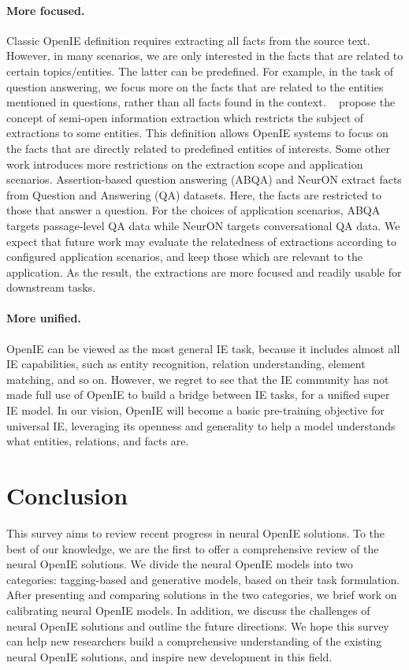 \documentclass{article}
\begin{document}
\paragraph{More focused.} Classic OpenIE definition requires extracting all facts from the source text. 
However, in many scenarios, we are only interested in the facts that are related to certain topics/entities. The latter can be predefined.  
For example, in the task of question answering, we focus more on the facts that are related to the entities mentioned in questions, rather than all facts found in the context.
\citeauthor{yu2021semi}~\citeyear{yu2021semi} propose the concept of semi-open information extraction which restricts the subject of extractions to some entities. This definition allows OpenIE systems to focus on the facts that are directly related to predefined entities of interests. Some other work introduces more restrictions on the extraction scope and application scenarios. Assertion-based question answering (ABQA) \cite{yan2018assertion} and NeurON \cite{bhutani-etal-2019-open} extract facts from Question and Answering (QA) datasets. Here, the facts are restricted to those that answer a question. For the choices of application scenarios, ABQA targets passage-level QA data while NeurON targets conversational QA data. We expect that future work may evaluate the relatedness of extractions according to configured application scenarios, and keep those which are relevant to the application. As the result, the extractions are more focused and readily usable for downstream tasks.

\paragraph{More unified.}
OpenIE can be viewed as the most general IE task, because it includes almost all IE capabilities, such as entity recognition, relation understanding, element matching, and so on.
However, we regret to see that the IE community has not made full use of OpenIE to build a bridge between IE tasks, for a unified super IE model.
In our vision, OpenIE will become a basic pre-training objective for universal IE, leveraging its openness and generality to help a model understands what entities, relations, and facts are.

\section{Conclusion}
This survey aims to review recent progress in neural OpenIE solutions. To the best of our knowledge, we are the first to offer a  comprehensive review of the neural OpenIE solutions. We divide the neural OpenIE models into two categories:  tagging-based and generative models,  based on their task formulation. After presenting and comparing solutions in the two categories, we brief work on calibrating neural OpenIE models. In addition, we discuss the challenges of neural OpenIE solutions and outline the future directions. We hope this survey can help new researchers build a comprehensive understanding of the existing neural OpenIE solutions,  and inspire new development in this field.
\end{document}
